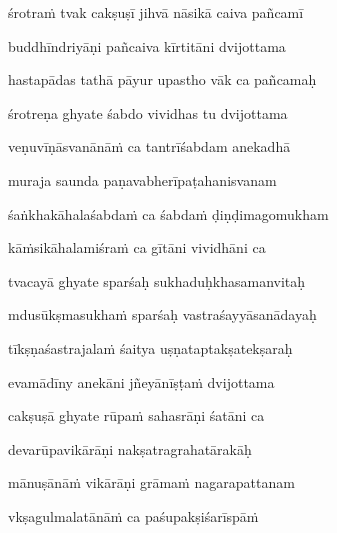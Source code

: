 śrotra\.m tvak cakṣuṣī jihvā nāsikā caiva pañcamī \veg\dontdisplaylinenum

buddhīndriyāṇi pañcaiva kīrtitāni dvijottama\thinspace{\dandab} \dontdisplaylinenum

hastapādas tathā pāyur upastho vāk ca pañcamaḥ \veg\dontdisplaylinenum



śrotreṇa ghyate śabdo vividhas tu dvijottama\thinspace{\dandab} \dontdisplaylinenum

veṇuvīṇāsvanānā\.m ca tantrīśabdam anekadhā \veg\dontdisplaylinenum

muraja saunda paṇavabherīpaṭahanisvanam\thinspace{\dandab} \dontdisplaylinenum

śaṅkhakāhalaśabda\.m ca śabda\.m ḍiṇḍimagomukham \veg\dontdisplaylinenum

kā\.msikāhalamiśra\.m ca gītāni vividhāni ca\thinspace{\dandab} \dontdisplaylinenum



tvacayā ghyate sparśaḥ sukhaduḥkhasamanvitaḥ \veg\dontdisplaylinenum

mdusūkṣmasukha\.m sparśaḥ vastraśayyāsanādayaḥ\thinspace{\dandab} \dontdisplaylinenum

tīkṣṇaśastrajala\.m śaitya uṣṇataptakṣatekṣaraḥ \veg\dontdisplaylinenum

evamādīny anekāni jñeyānīṣṭa\.m dvijottama\thinspace{\dandab} \dontdisplaylinenum



cakṣuṣā ghyate rūpa\.m sahasrāṇi śatāni ca \veg\dontdisplaylinenum

devarūpavikārāṇi nakṣatragrahatārakāḥ\thinspace{\dandab} \dontdisplaylinenum

mānuṣānā\.m vikārāṇi grāma\.m nagarapattanam \veg\dontdisplaylinenum

vkṣagulmalatānā\.m ca paśupakṣiśarīspā\.m\thinspace{\dandab} \dontdisplaylinenum

